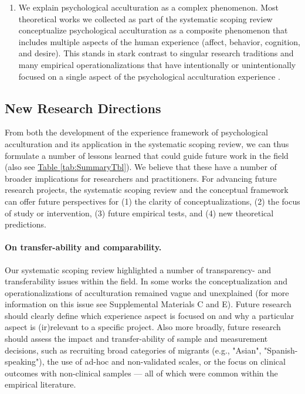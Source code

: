 \documentclass[man, 12pt, a4paper, mask]{apa7}
\newcommand{\tblref}[2][]{\hyperref[#2]{Table \ref*{#2}#1}}
\begin{document}
\begin{enumerate}
\item We explain psychological acculturation as a complex phenomenon. Most theoretical works we collected as part of the systematic scoping review conceptualize psychological acculturation as a composite phenomenon that includes multiple aspects of the human experience (affect, behavior, cognition, and desire). This stands in stark contrast to singular research traditions and many empirical operationalizations that have intentionally or unintentionally focused on a single aspect of the psychological acculturation experience \citep[also see][]{Ward2001}.
\end{enumerate}

\subsection{New Research Directions}
From both the development of the experience framework of psychological acculturation and its application in the systematic scoping review, we can thus formulate a number of lessons learned that could guide future work in the field (also see \tblref{tab:SummaryTbl}). We believe that these have a number of broader implications for researchers and practitioners.
For advancing future research projects, the systematic scoping review and the conceptual framework can offer future perspectives for (1) the clarity of conceptualizations, (2) the focus of study or intervention, (3) future empirical tests, and (4) new theoretical predictions. 

\paragraph{On transfer-ability and comparability.} Our systematic scoping review highlighted a number of transparency- and transferability issues within the field. In some works the conceptualization and operationalizations of acculturation remained vague and unexplained (for more information on this issue see Supplemental Materials C and E). Future research should clearly define which experience aspect is focused on and why a particular aspect is (ir)relevant to a specific project. Also more broadly, future research should assess the impact and transfer-ability of sample and measurement decisions, such as recruiting broad categories of migrants (e.g., "Asian", "Spanish-speaking"), the use of ad-hoc and non-validated scales, or the focus on clinical outcomes with non-clinical samples --- all of which were common within the empirical literature.
\end{document}
